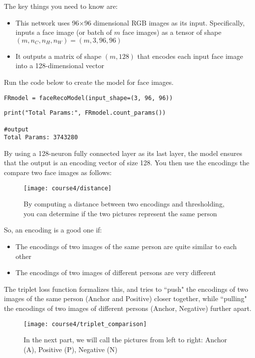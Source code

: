 The key things you need to know are:
\begin{itemize}
\item This network uses 96$\times$96 dimensional RGB images as its input. Specifically, inputs a face image (or batch of $m$ face images) as a tensor of shape $(m, n_C, n_H, n_W) = (m, 3, 96, 96)$ 
\item It outputs a matrix of shape $(m, 128)$ that encodes each input face image into a 128-dimensional vector
\end{itemize}

Run the code below to create the model for face images.
\begin{verbatim}
FRmodel = faceRecoModel(input_shape=(3, 96, 96))
\end{verbatim}

\begin{verbatim}
print("Total Params:", FRmodel.count_params())

#output
Total Params: 3743280
\end{verbatim}

By using a 128-neuron fully connected layer as its last layer, the model ensures that the output is an encoding vector of size 128. You then use the encodings the compare two face images as follows:
\begin{figure}[h]
\begin{center}
\texttt{[image: course4/distance]}
\caption{By computing a distance between two encodings and thresholding, you can determine if the two pictures represent the same person}
\end{center}
\end{figure}

So, an encoding is a good one if:
\begin{itemize}
\item The encodings of two images of the same person are quite similar to each other
\item The encodings of two images of different persons are very different
\end{itemize}

The triplet loss function formalizes this, and tries to ``push" the encodings of two images of the same person (Anchor and Positive) closer together, while ``pulling" the encodings of two images of different persons (Anchor, Negative) further apart.
\begin{figure}[h]
\begin{center}
\texttt{[image: course4/triplet\_comparison]}
\caption{In the next part, we will call the pictures from left to right: Anchor (A), Positive (P), Negative (N)}
\end{center}
\end{figure}



